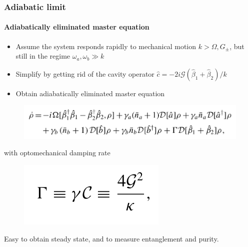 \documentclass[aspectratio=43]{beamer}
\begin{document}
\begin{frame}
	
	\frametitle{Adiabatic limit}
	\framesubtitle{Adiabatically eliminated master equation}
	
	\begin{itemize}
		\item Assume the system responds rapidly to mechanical motion $k > \Omega, G_{\pm}$, but still in the regime $\omega_{a}, \omega_{b} \gg k$
		\item Simplify by getting rid of the cavity operator $\hat{c} = -2i\mathcal{G}(\hat{\beta}_{1} + \hat{\beta}_{2})/k$\\
		\item Obtain adiabatically eliminated master equation
	\end{itemize}

	\begin{figure}
		\includegraphics[width = 9 cm]{plots/master_eq_2.png}
	\end{figure}

	with optomechanical damping rate
	\begin{figure}
		\includegraphics[width = 3 cm]{plots/optomechanic_dumping.png}
	\end{figure}

	Easy to obtain steady state, and to measure entanglement and purity.
	 
\end{frame}
\end{document}

